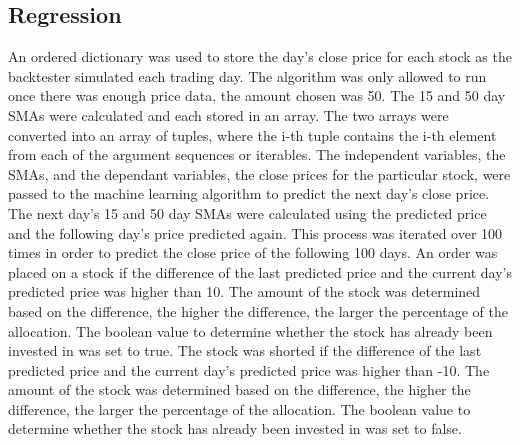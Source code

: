 \subsection{Regression}
An ordered dictionary was used to store the day's close price for each stock as the backtester simulated each trading day. The algorithm was only allowed to run once there was enough price data, the amount chosen was 50. The 15 and 50 day SMAs were calculated and each stored in an array. The two arrays were converted into an array of tuples, where the i-th tuple contains the i-th element from each of the argument sequences or iterables. The independent variables, the SMAs, and the dependant variables, the close prices for the particular stock, were passed to the machine learning algorithm to predict the next day's close price. The next day's 15 and 50 day SMAs were calculated using the predicted price and the following day's price predicted again. This process was iterated over 100 times in order to predict the close price of the following 100 days. An order was placed on a stock if the difference of the last predicted price and the current day's predicted price was higher than 10. The amount of the stock was determined based on the difference, the higher the difference, the larger the percentage of the allocation. The boolean value to determine whether the stock has already been invested in was set to true. The stock was shorted if the difference of the last predicted price and the current day's predicted price was higher than -10. The amount of the stock was determined based on the difference, the higher the difference, the larger the percentage of the allocation. The boolean value to determine whether the stock has already been invested in was set to false.